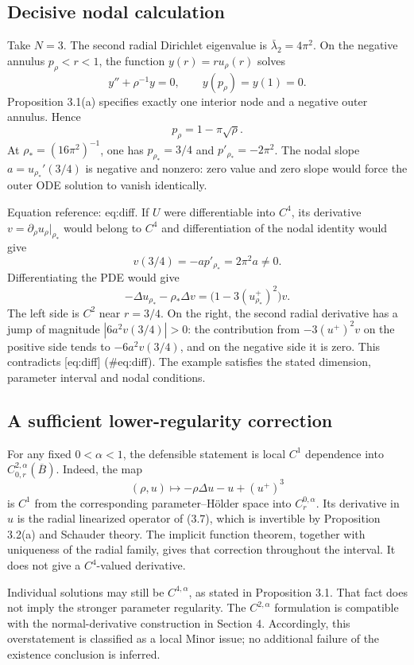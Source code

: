 \documentclass[10pt]{article}
\begin{document}
\subsection*{Decisive nodal calculation}
Take \(N=3\). The second radial Dirichlet eigenvalue is \(\bar\lambda_2=4\pi^2\). On the negative annulus \(p_\rho<r<1\), the function \(y(r)=r u_\rho(r)\) solves \[y''+\rho^{-1}y=0,\qquad y(p_\rho)=y(1)=0.\] Proposition 3.1(a) specifies exactly one interior node and a negative outer annulus. Hence \[p_\rho=1-\pi\sqrt\rho.\] At \(\rho_*=(16\pi^2)^{-1}\), one has \(p_{\rho_*}=3/4\) and \(p'_{\rho_*}=-2\pi^2\). The nodal slope \(a=u_{\rho_*}'(3/4)\) is negative and nonzero: zero value and zero slope would force the outer ODE solution to vanish identically.\par
Equation reference: eq:diff. If \(U\) were differentiable into \(C^4\), its derivative \(v=\partial_\rho u_\rho|_{\rho_*}\) would belong to \(C^4\) and differentiation of the nodal identity would give \[v(3/4)=-a p'_{\rho_*}=2\pi^2a\neq0.\] Differentiating the PDE would give \[
 -\Delta u_{\rho_*}-\rho_*\Delta v
   =\bigl(1-3(u_{\rho_*}^+)^2\bigr)v.\] The left side is \(C^2\) near \(r=3/4\). On the right, the second radial derivative has a jump of magnitude \(|6a^2v(3/4)|>0\): the contribution from \(-3(u^+)^2v\) on the positive side tends to \(-6a^2v(3/4)\), and on the negative side it is zero. This contradicts [eq:diff] (\#eq:diff). The example satisfies the stated dimension, parameter interval and nodal conditions.\par
\subsection*{A sufficient lower-regularity correction}
For any fixed \(0<\alpha<1\), the defensible statement is local \(C^1\) dependence into \(C^{2,\alpha}_{0,r}(\overline B)\). Indeed, the map \[(\rho,u)\longmapsto-\rho\Delta u-u+(u^+)^3\] is \(C^1\) from the corresponding parameter–Hölder space into \(C^{0,\alpha}_r\). Its derivative in \(u\) is the radial linearized operator of (3.7), which is invertible by Proposition 3.2(a) and Schauder theory. The implicit function theorem, together with uniqueness of the radial family, gives that correction throughout the interval. It does not give a \(C^4\)-valued derivative.\par
Individual solutions may still be \(C^{4,\alpha}\), as stated in Proposition 3.1. That fact does not imply the stronger parameter regularity. The \(C^{2,\alpha}\) formulation is compatible with the normal-derivative construction in Section 4. Accordingly, this overstatement is classified as a local Minor issue; no additional failure of the existence conclusion is inferred.\par
\end{document}
